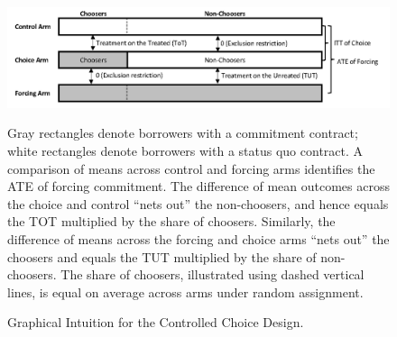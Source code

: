 \documentclass[12pt, a4paper]{article}
\begin{document}
\begin{figure}
\caption{Graphical Intuition for the Controlled Choice Design.} 
    \begin{center}
        \centering
        \includegraphics[width=1.0\textwidth]{Figuras/tot_tut_intuition.png}
    \end{center}
 \scriptsize{
    Gray rectangles denote borrowers with a commitment contract; white rectangles denote borrowers with a status quo contract. 
    A comparison of means across control and forcing arms identifies the ATE of forcing commitment. 
    The difference of mean outcomes across the choice and control ``nets out'' the non-choosers, and hence equals the TOT multiplied by the share of choosers.
    Similarly, the difference of means across the forcing and choice arms ``nets out'' the choosers and equals the TUT multiplied by the share of non-choosers.
        The share of choosers, illustrated using dashed vertical lines, is equal on average across arms under random assignment.}
    \label{tot_tut_graph}
\end{figure}   
\end{document}

